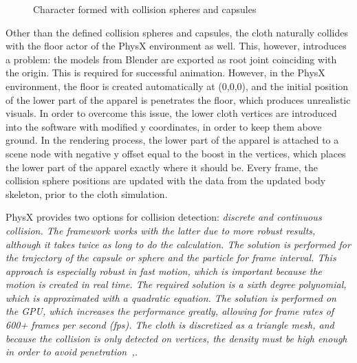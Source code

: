 \begin{figure}[h]
\centerline{}
\caption{Character formed with collision spheres and capsules}
\label{fig:colliding_human_body}
\end{figure}

Other than the defined collision spheres and capsules, the cloth naturally collides with the floor actor of the PhysX environment as well. This, however, introduces a problem: the models from Blender are exported as root joint coinciding with the origin. This is required for successful animation. However, in the PhysX environment, the floor is created automatically at (0,0,0), and the initial position of the lower part of the apparel is penetrates the floor, which produces unrealistic visuals. In order to overcome this issue, the lower cloth vertices are introduced into the software with modified y coordinates, in order to keep them above ground. In the rendering process, the lower part of the apparel is attached to a scene node with negative y offset equal to the boost in the vertices, which places the lower part of the apparel exactly where it should be. Every frame, the collision sphere positions are updated with the data from the updated body skeleton, prior to the cloth simulation. 

PhysX provides two options for collision detection: \em{discrete} and \em{continuous} collision. The framework works with the latter due to more robust results, although it takes twice as long to do the calculation. The solution is performed for the trajectory of the capsule or sphere and the particle for frame interval. This approach is especially robust in fast motion, which is important because the motion is created in real time. The required solution is a sixth degree polynomial, which is approximated with a quadratic equation. The solution is performed on the GPU, which increases the performance greatly, allowing for frame rates of 600+ frames per second (fps). The cloth is discretized as a triangle mesh, and because the collision is only detected on vertices, the density must be high enough in order to avoid penetration~\cite{Kim2011},\cite{Tonge2010}. 

